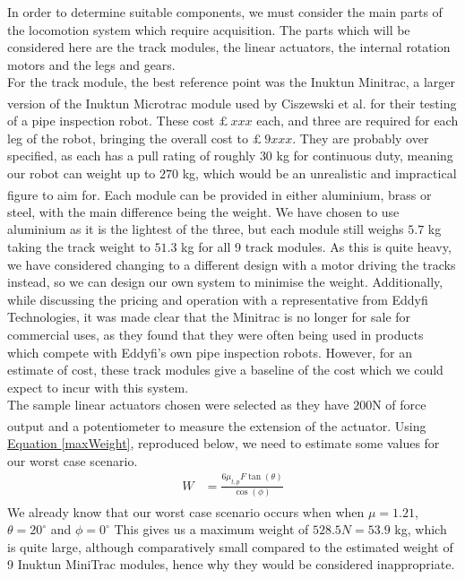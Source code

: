 \documentclass[11pt]{article}		%
\begin{document}
		In order to determine suitable components, we must consider the main parts of the locomotion system which require acquisition.
		The parts which will be considered here are the track modules, the linear actuators, the internal rotation motors and the legs and gears.
		\\
		For the track module, the best reference point was the Inuktun Minitrac, a larger version of the Inuktun Microtrac module used by Ciszewski et al.\textsuperscript{\cite{ciszewski2015design}} for their testing of a pipe inspection robot.
		These cost $£ \ xxx$ each, and three are required for each leg of the robot, bringing the overall cost to $£ \ 9xxx$.
		They are probably over specified, as each has a pull rating of roughly $30$ kg for continuous duty, meaning our robot can weight up to $270$ kg, which would be an unrealistic and impractical figure to aim for\textsuperscript{\cite{inuktunTracks}}.
		Each module can be provided in either aluminium, brass or steel, with the main difference being the weight.
		We have chosen to use aluminium as it is the lightest of the three, but each module still weighs $5.7$ kg taking the track weight to $51.3$ kg for all 9 track modules.
		As this is quite heavy, we have considered changing to a different design with a motor driving the tracks instead, so we can design our own system to minimise the weight.
		Additionally, while discussing the pricing and operation with a representative from Eddyfi Technologies, it was made clear that the Minitrac is no longer for sale for commercial uses, as they found that they were often being used in products which compete with Eddyfi's own pipe inspection robots.
		However, for an estimate of cost, these track modules give a baseline of the cost which we could expect to incur with this system.
		\\
		The sample linear actuators chosen were selected as they have $200$N of force output and a potentiometer to measure the extension of the actuator\textsuperscript{\cite{rsproLinear}}.
		Using \hyperref[maxWeight]{Equation \ref*{maxWeight}}, reproduced below, we need to estimate some values for our worst case scenario.
		\begin{align*}
			W &= \frac{6 \mu_{t,p} F \tan \left( \theta \right)}{\cos \left( \phi \right)}
		\end{align*}
		We already know that our worst case scenario occurs when when $ \mu = 1.21$\textsuperscript{\cite{sato2011development}}, $\theta = 20^\circ$ and $\phi = 0^\circ$
		This gives us a maximum weight of $528.5 N = 53.9$ kg, which is quite large, although comparatively small compared to the estimated weight of 9 Inuktun MiniTrac modules, hence why they would be considered inappropriate.
\end{document}
